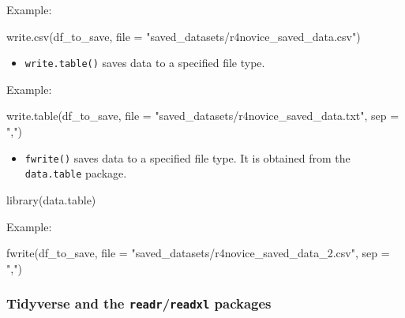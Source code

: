 \documentclass[
  letterpaper,
  DIV=11,
  numbers=noendperiod]{scrreprt}
\newenvironment{Shaded}{}{}
\newcommand{\AttributeTok}[1]{\textcolor[rgb]{0.84,0.23,0.29}{#1}}
\newcommand{\FunctionTok}[1]{\textcolor[rgb]{0.44,0.26,0.76}{#1}}
\newcommand{\NormalTok}[1]{\textcolor[rgb]{0.14,0.16,0.18}{#1}}
\newcommand{\StringTok}[1]{\textcolor[rgb]{0.01,0.18,0.38}{#1}}
\providecommand{\tightlist}{%
  \setlength{\itemsep}{0pt}\setlength{\parskip}{0pt}}\usepackage{longtable,booktabs,array}
\begin{document}
Example:

\begin{Shaded}
\begin{Highlighting}[]
\FunctionTok{write.csv}\NormalTok{(df\_to\_save, }\AttributeTok{file =} \StringTok{"saved\_datasets/r4novice\_saved\_data.csv"}\NormalTok{)}
\end{Highlighting}
\end{Shaded}

\begin{itemize}
\tightlist
\item
  \texttt{write.table()} saves data to a specified file type.
\end{itemize}

Example:

\begin{Shaded}
\begin{Highlighting}[]
\FunctionTok{write.table}\NormalTok{(df\_to\_save, }\AttributeTok{file =} \StringTok{"saved\_datasets/r4novice\_saved\_data.txt"}\NormalTok{, }\AttributeTok{sep =} \StringTok{","}\NormalTok{)}
\end{Highlighting}
\end{Shaded}

\begin{itemize}
\tightlist
\item
  \texttt{fwrite()} saves data to a specified file type. It is obtained
  from the \texttt{data.table} package.
\end{itemize}

\begin{Shaded}
\begin{Highlighting}[]
\FunctionTok{library}\NormalTok{(data.table)}
\end{Highlighting}
\end{Shaded}

Example:

\begin{Shaded}
\begin{Highlighting}[]
\FunctionTok{fwrite}\NormalTok{(df\_to\_save, }\AttributeTok{file =} \StringTok{"saved\_datasets/r4novice\_saved\_data\_2.csv"}\NormalTok{, }\AttributeTok{sep =} \StringTok{","}\NormalTok{)}
\end{Highlighting}
\end{Shaded}

\subsubsection{\texorpdfstring{Tidyverse and the
\texttt{readr}/\texttt{readxl}
packages}{Tidyverse and the readr/readxl packages}}\label{tidyverse-and-the-readrreadxl-packages-1}
\end{document}
